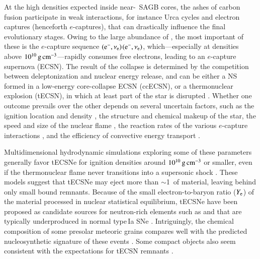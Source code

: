 \documentclass[main.tex]{subfiles}
\begin{document}
At the high densities expected inside near-\mch\ SAGB cores, the 
 ashes of carbon fusion participate in weak interactions, for instance Urca cycles and electron captures (henceforth $e$-captures), that can drastically influence the final evolutionary stages. 
Owing to the large abundance of , the most 
important of these is the $e$-capture sequence $(\mathrm{e^{-}},\mathrm{\nu_{e}})$$(\mathrm{e^{-}},\mathrm{\nu_{e}})$,  
which---especially at densities above $10^{10}\mathrm{\,g\,cm^{-3}}$---rapidly consumes free electrons, leading to an $e$-capture supernova (ECSN). The result of the collapse is determined by the competition between 
deleptonization and nuclear energy release, and can be either a NS formed in a low-energy core-collapse ECSN (ccECSN), or a thermonuclear explosion (tECSN), in which at least part of the star is disrupted \citep{miyaji1980,nomoto1984,canal1992,kitaura2006,gutierrez1996a,jones2014}.
Whether one outcome prevails over the other depends on several uncertain factors, such as the ignition location and density \citep{Leung:2019phz}, the structure and chemical makeup of the star, the  speed and size of the nuclear flame \citep{timmes1992a,schwab2020}, the reaction rates of 
the various $e$-capture interactions \citep{kirsebom2019a}, and the efficiency of convective energy transport \citep{Schwab:2018cnb}. 

Multidimensional hydrodynamic simulations exploring some of these parameters
\citep[e.g.,][]{Jones:2016asr,Jones:2018ule,Leung:2019phz}
generally favor tECSNe for ignition densities around $10^{10}\mathrm{\,g\,cm^{-3}}$ or smaller, even if the thermonuclear flame never transitions into a supersonic shock \citep[e.g.,][]{Jones:2018ule}. 
These models suggest that tECSNe may eject more than $\sim$1\msun\ of material, leaving behind only small bound remnants. Because of the small electron-to-baryon ratio ($Y_{\rm e}$) of the material  
processed in nuclear statistical equilibrium, tECSNe have been proposed as candidate sources for neutron-rich elements such as  and  that are typically
underproduced in normal type\,Ia SNe \citep[\ias;][]{Jones:2018ule}. Intriguingly, the chemical composition of some presolar meteoric grains compares well with  the  predicted nucleosynthetic signature of these events \citep{Jones:2018ule}. Some compact objects also seem consistent with the expectations for tECSN remnants \citep{raddi2019a,tauris2019}. 
\end{document}
